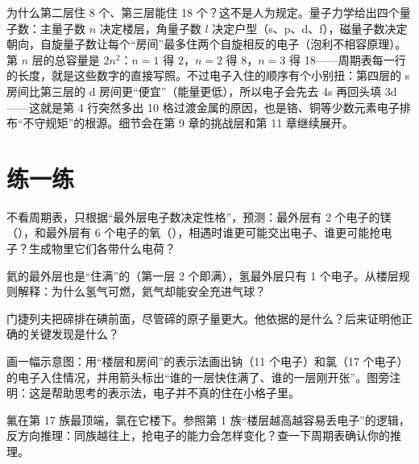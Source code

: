 \begin{tiaozhan}
为什么第二层住 8 个、第三层能住 18 个？这不是人为规定。量子力学给出四个量子数：主量子数 $n$ 决定楼层，角量子数 $l$ 决定户型（s、p、d、f），磁量子数决定朝向，自旋量子数让每个“房间”最多住两个自旋相反的电子（泡利不相容原理）。第 $n$ 层的总容量是 $2n^2$：$n=1$ 得 2，$n=2$ 得 8，$n=3$ 得 18——周期表每一行的长度，就是这些数字的直接写照。不过电子入住的顺序有个小别扭：第四层的 s 房间比第三层的 d 房间更“便宜”（能量更低），所以电子会先去 4s 再回头填 3d——这就是第 4 行突然多出 10 格过渡金属的原因，也是铬、铜等少数元素电子排布“不守规矩”的根源。细节会在第 9 章的挑战层和第 11 章继续展开。
\end{tiaozhan}

\section*{练一练}

\begin{sikaoti}
\item 不看周期表，只根据“最外层电子数决定性格”，预测：最外层有 2 个电子的镁（），和最外层有 6 个电子的氧（），相遇时谁更可能交出电子、谁更可能抢电子？生成物里它们各带什么电荷？
\item 氦的最外层也是“住满”的（第一层 2 个即满），氢最外层只有 1 个电子。从楼层规则解释：为什么氢气可燃，氦气却能安全充进气球？
\item 门捷列夫把碲排在碘前面，尽管碲的原子量更大。他依据的是什么？后来证明他正确的关键发现是什么？
\item 画一幅示意图：用“楼层和房间”的表示法画出钠（11 个电子）和氯（17 个电子）的电子入住情况，并用箭头标出“谁的一层快住满了、谁的一层刚开张”。图旁注明：这是帮助思考的表示法，电子并不真的住在小格子里。
\item 氟在第 17 族最顶端，氯在它楼下。参照第 1 族“楼层越高越容易丢电子”的逻辑，反方向推理：同族越往上，抢电子的能力会怎样变化？查一下周期表确认你的推理。
\end{sikaoti}

